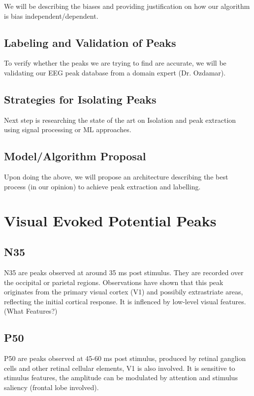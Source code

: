 \documentclass{article}
\begin{document}
	We will be describing the biases and providing justification on how our algorithm is bias independent/dependent.
	
	\subsection{Labeling and Validation of Peaks}
	
	To verify whether the peaks we are trying to find are accurate, we will be validating our EEG peak database from a domain expert (Dr. Ozdamar).
	
	\subsection{Strategies for Isolating Peaks}
	Next step is researching the state of the art on Isolation and peak extraction using signal processing or ML approaches.
	
	\subsection{Model/Algorithm Proposal}
	
	Upon doing the above, we will propose an architecture describing the best process (in our opinion) to achieve peak extraction and labelling.
	
	

		
	
	
	\newpage
	
	\section{Visual Evoked Potential Peaks\cite{becker2005visual}}
	
	\subsection{N35}
	N35 are peaks observed at around 35 ms post stimulus. They are recorded over the occipital or parietal regions. Observations have shown that this peak originates from the primary visual cortex (V1) and possibily extrastriate areas, reflecting the initial cortical response. It is inflenced by low-level visual features. (What Features?)
	
	\subsection{P50}
	P50 are peaks observed at 45-60 ms post stimulus, produced by retinal ganglion cells and other retinal cellular elements, V1 is also involved. It is sensitive to stimulus features, the amplitude can be modulated by attention and stimulus saliency (frontal lobe involved).
	
\end{document}
